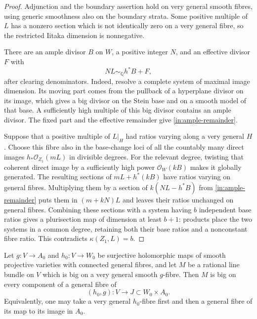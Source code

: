 \begin{proof}
Adjunction and the boundary assertion hold on very general smooth
fibres, using generic smoothness also on the boundary strata.
Some positive multiple of $L$ has a nonzero section which is not
identically zero on a very general fibre, so the restricted Iitaka
dimension is nonnegative.

There are an ample divisor $B$ on $W$, a positive integer $N$, and
an effective divisor $F$ with
\begin{equation}\label{in:ample-remainder}
 NL\sim_{\mathbb Q}h^*B+F,
\end{equation}
after clearing denominators.  Indeed, resolve a complete system of
maximal image dimension.  Its moving part comes from the pullback of
a hyperplane divisor on its image, which gives a big divisor on the
Stein base and on a smooth model of that base.  A sufficiently high
multiple of this big divisor contains an ample divisor.  The fixed
part and the effective remainder give \eqref{in:ample-remainder}.

Suppose that a positive multiple of $L|_H$ had ratios varying along
a very general $H$.  Choose this fibre also in the base-change loci
of all the countably many direct images $h_*\mathcal O_{Z_1}(mL)$
in divisible degrees.  For the relevant degree, twisting that
coherent direct image by a sufficiently high power $\mathcal O_W(kB)$
makes it globally generated.  The resulting sections of
$mL+h^*(kB)$ have ratios varying on general fibres.  Multiplying
them by a section of $k(NL-h^*B)$ from
\eqref{in:ample-remainder} puts them in $(m+kN)L$ and leaves their
ratios unchanged on general fibres.  Combining these sections with a
system having $b$ independent base ratios gives a plurisection map
of dimension at least $b+1$: products place the two systems in a
common degree, retaining both their base ratios and a nonconstant
fibre ratio.  This contradicts $\kappa(Z_1,L)=b$.
\end{proof}

\begin{lemma}\label{in:common-fibres}
Let $g:V\to A_0$ and $h_0:V\to W_0$ be surjective holomorphic maps
of smooth projective varieties with connected general fibres, and let
$M$ be a rational line bundle on $V$ which is big on a very general
smooth $g$-fibre.  Then $M$ is big on every component of a general
fibre of
\[
 (h_0,g):V\longrightarrow J\subset W_0\times A_0.
\]
Equivalently, one may take a very general $h_0$-fibre first and then
a general fibre of its map to its image in $A_0$.
\end{lemma}

